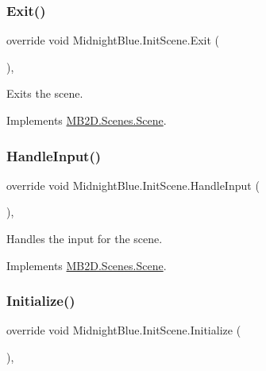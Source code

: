 \subsubsection{\texorpdfstring{Exit()}{Exit()}}
{\footnotesize\ttfamily override void Midnight\+Blue.\+Init\+Scene.\+Exit (\begin{DoxyParamCaption}{ }\end{DoxyParamCaption})\hspace{0.3cm}{\ttfamily [inline]}, {\ttfamily [virtual]}}



Exits the scene. 



Implements \hyperlink{class_m_b2_d_1_1_scenes_1_1_scene_a099b79e16d23b67349847999d2336813}{M\+B2\+D.\+Scenes.\+Scene}.

\hypertarget{class_midnight_blue_1_1_init_scene_a4a8d9c22193d334e41685ce62fa11dd9}{}\label{class_midnight_blue_1_1_init_scene_a4a8d9c22193d334e41685ce62fa11dd9} 
\subsubsection{\texorpdfstring{Handle\+Input()}{HandleInput()}}
{\footnotesize\ttfamily override void Midnight\+Blue.\+Init\+Scene.\+Handle\+Input (\begin{DoxyParamCaption}{ }\end{DoxyParamCaption})\hspace{0.3cm}{\ttfamily [inline]}, {\ttfamily [virtual]}}



Handles the input for the scene. 



Implements \hyperlink{class_m_b2_d_1_1_scenes_1_1_scene_a476de5a885408d27ff151044d20738c8}{M\+B2\+D.\+Scenes.\+Scene}.

\hypertarget{class_midnight_blue_1_1_init_scene_a99eee8cc5dab8d7263591aeaa50144fb}{}\label{class_midnight_blue_1_1_init_scene_a99eee8cc5dab8d7263591aeaa50144fb} 
\subsubsection{\texorpdfstring{Initialize()}{Initialize()}}
{\footnotesize\ttfamily override void Midnight\+Blue.\+Init\+Scene.\+Initialize (\begin{DoxyParamCaption}{ }\end{DoxyParamCaption})\hspace{0.3cm}{\ttfamily [inline]}, {\ttfamily [virtual]}}




